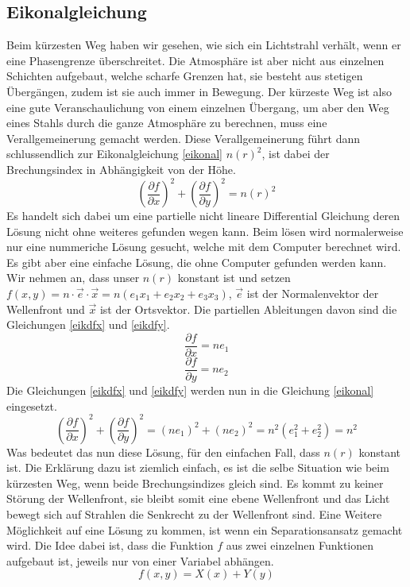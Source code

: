 \begin{refsection}
\section{Eikonalgleichung}
Beim kürzesten Weg haben wir gesehen, wie sich ein Lichtstrahl verhält, wenn er eine Phasengrenze überschreitet. Die Atmosphäre ist aber nicht aus einzelnen Schichten aufgebaut, welche scharfe Grenzen hat, sie besteht aus stetigen Übergängen, zudem ist sie auch immer in Bewegung. Der kürzeste Weg ist also eine gute Veranschaulichung von einem einzelnen Übergang, um aber den Weg eines Stahls durch die ganze Atmosphäre zu berechnen, muss eine Verallgemeinerung gemacht werden. Diese Verallgemeinerung führt dann schlussendlich zur Eikonalgleichung \eqref{eikonal} $n(r)^{2}$, ist dabei der Brechungsindex in Abhängigkeit von der Höhe. 
\begin{equation}\label{eikonal}
\left( \dfrac{\partial f}{\partial x}\right)^{2} + \left( \dfrac{\partial f}{\partial y}\right) ^{2} = n(r)^{2}
\end{equation}
Es handelt sich dabei um eine partielle nicht lineare Differential Gleichung deren Lösung nicht ohne weiteres gefunden wegen kann. Beim lösen wird normalerweise nur eine nummeriche Lösung gesucht, welche mit dem Computer berechnet wird. Es gibt aber eine einfache Lösung, die ohne Computer gefunden werden kann. Wir nehmen an, dass unser $n(r)$ konstant ist und setzen $f(x,y)=n\cdot\vec{e}\cdot\vec{x}= n(e_{1}x_{1}+e_{2}x_{2}+e_{3}x_{3})$, $\vec{e}$ ist der Normalenvektor der Wellenfront und $\vec{x}$ ist der Ortsvektor. Die partiellen Ableitungen davon sind die Gleichungen \eqref{eikdfx} und \eqref{eikdfy}.
\begin{equation}\label{eikdfx}
\dfrac{\partial f}{\partial x} = ne_{1}
\end{equation}
\begin{equation}\label{eikdfy}
\dfrac{\partial f}{\partial y} = ne_{2}
\end{equation}
Die Gleichungen \eqref{eikdfx} und \eqref{eikdfy} werden nun in die Gleichung \eqref{eikonal} eingesetzt.
\begin{equation}\label{eikonal}
\left( \dfrac{\partial f}{\partial x}\right)^{2} + \left( \dfrac{\partial f}{\partial y}\right) ^{2} = \left( ne_{1}\right) ^{2}+\left( ne_{2}\right)^{2}=n^{2}(e_{1}^{2}+e_{2}^{2})=n^{2}
\end{equation}
Was bedeutet das nun diese Lösung, für den einfachen Fall, dass $n(r)$ konstant ist. Die Erklärung dazu ist ziemlich einfach, es ist die selbe Situation wie beim kürzesten Weg, wenn beide Brechungsindizes gleich sind. Es kommt zu keiner Störung der Wellenfront, sie bleibt somit eine ebene Wellenfront und das Licht bewegt sich auf Strahlen die Senkrecht zu der Wellenfront sind.
Eine Weitere Möglichkeit auf eine Lösung zu kommen, ist wenn ein Separationsansatz gemacht wird. Die Idee dabei ist, dass die Funktion $f$ aus zwei einzelnen Funktionen aufgebaut ist, jeweils nur von einer Variabel abhängen. 
\begin{equation}
f(x,y)=X(x) + Y(y)
\end{equation}

\printbibliography[heading=subbibliography]
\end{refsection}















